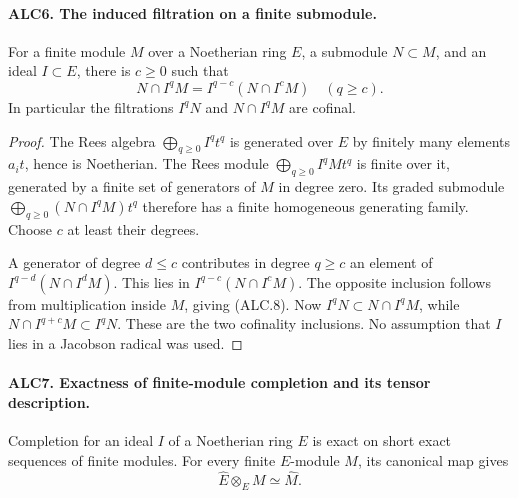 \paragraph{ALC6. The induced filtration on a finite submodule.}
\label{claim:ALC6}
For a finite module \(M\) over a Noetherian ring \(E\), a
submodule \(N\subset M\), and an ideal \(I\subset E\),
there is \(c\ge0\) such that
\[
 N\cap I^qM=I^{q-c}(N\cap I^cM)\quad(q\ge c).
                                                        \tag{ALC.8}
\]
In particular the filtrations \(I^qN\) and \(N\cap I^qM\)
are cofinal.

\begin{proof}
The Rees algebra \(\bigoplus_{q\ge0}I^qt^q\) is generated
over \(E\) by finitely many elements \(a_it\), hence is
Noetherian.  The Rees module \(\bigoplus_{q\ge0}I^qMt^q\)
is finite over it, generated by a finite set of generators of
\(M\) in degree zero.  Its graded submodule
\(\bigoplus_{q\ge0}(N\cap I^qM)t^q\) therefore has a
finite homogeneous generating family.  Choose \(c\) at
least their degrees.

A generator of degree \(d\le c\) contributes in degree
\(q\ge c\) an element of
\(I^{q-d}(N\cap I^dM)\).  This lies in
\(I^{q-c}(N\cap I^cM)\).  The opposite inclusion follows
from multiplication inside \(M\), giving (ALC.8).
Now \(I^qN\subset N\cap I^qM\), while
\(N\cap I^{q+c}M\subset I^qN\).  These are the two
cofinality inclusions.  No assumption that \(I\) lies in a
Jacobson radical was used.
\end{proof}

\paragraph{ALC7. Exactness of finite-module completion and its tensor description.}
\label{claim:ALC7}
Completion for an ideal \(I\) of a Noetherian ring \(E\)
is exact on short exact sequences of finite modules.  For
every finite \(E\)-module \(M\), its canonical map gives
\[
               \widehat E\otimes_E M\simeq\widehat M.
                                                        \tag{ALC.9}
\]

